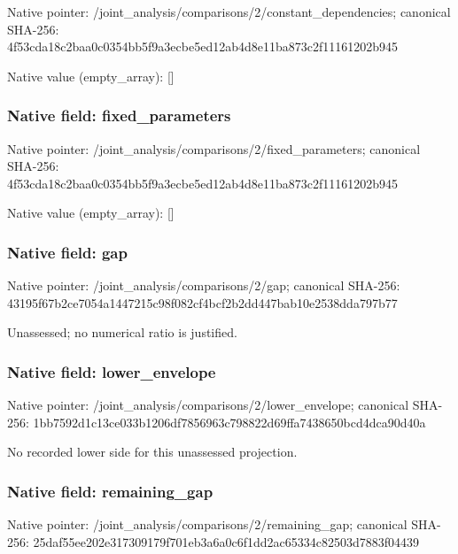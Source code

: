 \documentclass[10pt,a4paper]{article}
\begin{document}
Native pointer: /joint\_analysis/comparis\allowbreak{}ons/2/constant\_dependenc\allowbreak{}ies; canonical SHA-256: 4f53cda18c2baa0c0354bb5f\allowbreak{}9a3ecbe5ed12ab4d8e11ba87\allowbreak{}3c2f11161202b945



Native value (empty\_array): []



\subsubsection{Native field: fixed\_parameters}


Native pointer: /joint\_analysis/comparis\allowbreak{}ons/2/fixed\_parameters; canonical SHA-256: 4f53cda18c2baa0c0354bb5f\allowbreak{}9a3ecbe5ed12ab4d8e11ba87\allowbreak{}3c2f11161202b945



Native value (empty\_array): []



\subsubsection{Native field: gap}


Native pointer: /joint\_analysis/comparisons/2/gap; canonical SHA-256: 43195f67b2ce7054a1447215\allowbreak{}c98f082cf4bcf2b2dd447bab\allowbreak{}10e2538dda797b77


Unassessed; no numerical ratio is justified.


\subsubsection{Native field: lower\_envelope}


Native pointer: /joint\_analysis/comparis\allowbreak{}ons/2/lower\_envelope; canonical SHA-256: 1bb7592d1c13ce033b1206df\allowbreak{}7856963c798822d69ffa7438\allowbreak{}650bcd4dca90d40a


No recorded lower side for this unassessed projection.


\subsubsection{Native field: remaining\_gap}


Native pointer: /joint\_analysis/comparis\allowbreak{}ons/2/remaining\_gap; canonical SHA-256: 25daf55ee202e317309179f7\allowbreak{}01eb3a6a0c6f1dd2ac65334c\allowbreak{}82503d7883f04439
\end{document}

